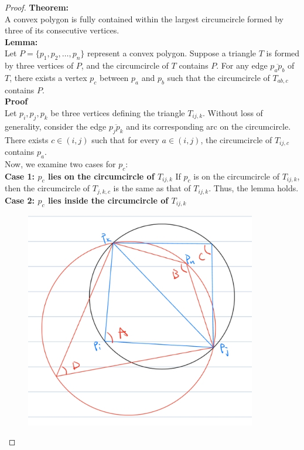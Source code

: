 \documentclass{article}
\begin{document}
\begin{proof}
    \textbf{Theorem: }
    \\
    A convex polygon is fully contained within the largest circumcircle formed by three of its consecutive vertices.
    \\
    \textbf{Lemma: }
    \\
    Let \( P = \{p_1, p_2, \ldots, p_n\} \) represent a convex polygon. Suppose a triangle \( T \) is formed by three vertices of \( P \), and the circumcircle of \( T \) contains \( P \). For any edge \( \overline{p_a p_b} \) of \( T \), there exists a vertex \( p_c \) between \( p_a \) and \( p_b \) such that the circumcircle of \( T_{ab,c} \) contains \( P \).
    \\
    \textbf{Proof}
    \\
    Let \( p_i, p_j, p_k \) be three vertices defining the triangle \( T_{ij,k} \). Without loss of generality, consider the edge \( \overline{p_jp_k} \) and its corresponding arc on the circumcircle. There exists \( c \in (i, j) \) such that for every \( a \in (i, j) \), the circumcircle of \( T_{ij,c} \) contains \( p_a \).
    \\
    Now, we examine two cases for \( p_c \):
    \\
    \textbf{Case 1: \( p_c \) lies on the circumcircle of \( T_{ij,k} \)}
    If \( p_c \) is on the circumcircle of \( T_{ij,k} \), then the circumcircle of \( T_{j,k,c} \) is the same as that of \( T_{ij,k} \). Thus, the lemma holds.
    \\
    \textbf{Case 2: \( p_c \) lies inside the circumcircle of \( T_{ij,k} \)}
    \begin{figure}[h]
        \centering
        \includegraphics[width=0.9\textwidth]{HW5_Q2_Proof_Helper_Graph.png}

\end{figure}
\end{proof}
\end{document}
